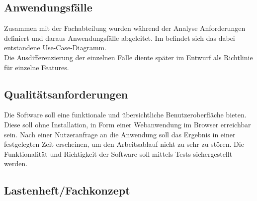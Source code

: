 \subsection{Anwendungsfälle}
\label{sec:Anwendungsfaelle}
Zusammen mit der Fachabteilung wurden während der Analyse Anforderungen definiert und daraus Anwendungsfälle
abgeleitet. Im  befindet sich das dabei entstandene Use-Case-Diagramm.\\
Die Ausdifferenzierung der einzelnen Fälle diente später im Entwurf als Richtlinie für einzelne Features.

\subsection{Qualitätsanforderungen}
\label{sec:Qualitaetsanforderungen}
Die Software soll eine funktionale und übersichtliche Benutzeroberfläche bieten.
Diese soll ohne Installation, in Form einer Webanwendung im Browser erreichbar sein.
Nach einer Nutzeranfrage an die Anwendung soll das Ergebnis in einer festgelegten Zeit erscheinen,
um den Arbeitsablauf nicht zu sehr zu stören.
Die Funktionalität und Richtigkeit der Software soll mittels Tests sichergestellt werden.


\subsection{Lastenheft/Fachkonzept}
\label{sec:Lastenheft}

